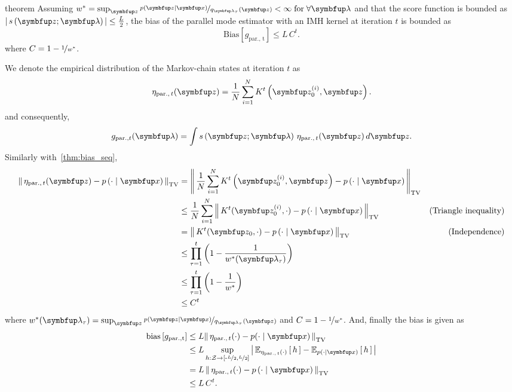 
\begin{theoremEnd}{theorem}
  Assuming \(w^* = \sup_{\vz} \nicefrac{p\left(\vz\mid\vx\right)}{q_{\vlambda_{\tau}}\left(\vz\right)} < \infty \; \text{for}\;\forall \vlambda \) and that the score function is bounded as \(\left|\, s\left(\vz; \vlambda\right) \,\right| \leq \frac{L}{2}\), the bias of the parallel mode estimator with an IMH kernel at iteration \(t\) is bounded as
  {\small
\[
    \mathrm{Bias}\left[ g_{\mathrm{par.,\, t}} \right] \leq L\,C^t.
\]
  }
  where \(C = 1 - \nicefrac{1}{w^*}\).
\end{theoremEnd}
\begin{proofEnd}
  We denote the empirical distribution of the Markov-chain states at iteration \(t\) as
  \begin{align}
    \eta_{\mathrm{par.},\, t}(\vz) = \frac{1}{N} \sum_{i=1}^N K^{t}\left(\vz_0^{(i)}, \vz\right).
  \end{align}
  and consequently,
  \begin{align}
      g_{\mathrm{par.}, t}(\vlambda) = \int s\left(\vz; \vlambda\right) \, \eta_{\mathrm{par.},\, t}(\vz) \, d\vz.
  \end{align}
  Similarly with~\cref{thm:bias_seq}, 
  \begin{align}
    \DTV{ \eta_{\mathrm{par.},\, t}(\vz) }{p\left(\cdot\mid\vx\right)}
    &= \DTV{\frac{1}{N} \sum_{i=1}^N K^{t}\left(\vz_0^{(i)}, \vz\right)}{p\left(\cdot\mid\vx\right)} \\
    &\leq \frac{1}{N} \sum_{i=1}^N  \DTV{K^t(\vz_0^{(i)}, \cdot)}{p\left(\cdot\mid\vx\right)} &\text{(Triangle inequality)} \\
    &=    \DTV{K^t(\vz_0, \cdot)}{p\left(\cdot\mid\vx\right)} &\text{(Independence)} \\
    &\leq \prod_{\tau=1}^t {\left(1 - \frac{1}{w^*(\vlambda_{\tau})}\right)} \\
    &\leq \prod_{\tau=1}^t {\left(1 - \frac{1}{w^*}\right)} \\
    &\leq C^t
  \end{align}
  where \(w^*(\vlambda_{\tau}) = \sup_{\vz} \nicefrac{p\left(\vz\mid\vx\right)}{q_{\vlambda_{\tau}}\left(\vz\right)} \) and \(C = 1 - \nicefrac{1}{w^*}\).
  And, finally the bias is given as
 \begin{align}
   \mathrm{bias}\left[ g_{\mathrm{par., t}} \right]
   &\leq L \DTV{\eta_{\mathrm{par.},\, t}(\cdot)}{p(\cdot\mid\vx)} \\
   &\leq L \sup_{h : \mathcal{Z} \rightarrow \left[ \text{-}\nicefrac{L}{2}, \nicefrac{L}{2} \right]} \left|\, \Esub{\eta_{\mathrm{par.},\, t}(\cdot)}{h} - \Esub{p(\cdot\mid\vx)}{h} \,\right| \\
   &= L\, \DTV{ \eta_{\mathrm{par.},\, t}(\cdot) }{p\left(\cdot\mid\vx\right)}  \\
   &\leq L \, C^t.
 \end{align}
\end{proofEnd}

